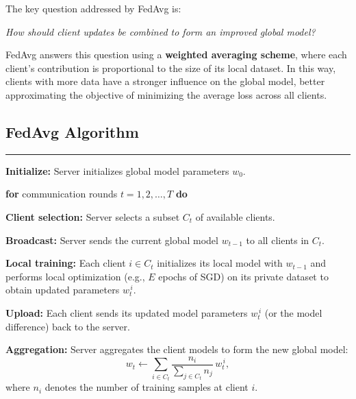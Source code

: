 The key question addressed by FedAvg is:

\begin{center}
\emph{How should client updates be combined to form an improved global model?}
\end{center}

FedAvg answers this question using a \textbf{weighted averaging scheme}, where each
client’s contribution is proportional to the size of its local dataset. In this way,
clients with more data have a stronger influence on the global model, better approximating
the objective of minimizing the average loss across all clients.

\subsection{FedAvg Algorithm}

\vspace{0.3cm}

\noindent\rule{\textwidth}{0.8pt}

\noindent\textbf{Initialize:}  
Server initializes global model parameters $w_0$.

\noindent\textbf{for} communication rounds $t = 1, 2, \dots, T$ \textbf{do}

\noindent\hspace{0.6cm}\textbf{Client selection:}  
\noindent\hspace{0.6cm}Server selects a subset $C_t$ of available clients.

\noindent\hspace{0.6cm}\textbf{Broadcast:}  
\noindent\hspace{0.6cm}Server sends the current global model $w_{t-1}$ to all clients in $C_t$.

\noindent\hspace{0.6cm}\textbf{Local training:}  
\noindent\hspace{0.6cm}Each client $i \in C_t$ initializes its local model with $w_{t-1}$ and
performs local optimization (e.g., $E$ epochs of SGD) on its private dataset to obtain
updated parameters $w_t^{\,i}$.

\noindent\hspace{0.6cm}\textbf{Upload:}  
\noindent\hspace{0.6cm}Each client sends its updated model parameters $w_t^{\,i}$ (or the
model difference) back to the server.

\noindent\hspace{0.6cm}\textbf{Aggregation:}  
\noindent\hspace{0.6cm}Server aggregates the client models to form the new global model:
\[
w_t
\leftarrow
\sum_{i \in C_t}
\frac{n_i}{\sum_{j \in C_t} n_j}
\,
w_t^{\,i},
\]
where $n_i$ denotes the number of training samples at client $i$.

